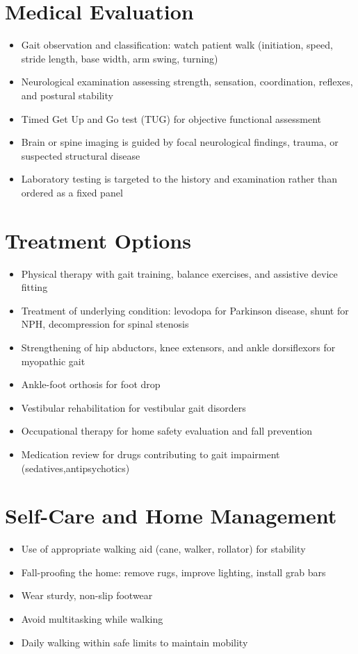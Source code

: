 \section*{Medical Evaluation}
\begin{itemize}
  \item Gait observation and classification: watch patient walk (initiation, speed, stride length, base width, arm swing, turning)
  \item Neurological examination assessing strength, sensation, coordination, reflexes, and postural stability
  \item Timed Get Up and Go test (TUG) for objective functional assessment
  \item Brain or spine imaging is guided by focal neurological findings, trauma, or suspected structural disease
  \item Laboratory testing is targeted to the history and examination rather than ordered as a fixed panel
\end{itemize}

\section*{Treatment Options}
\begin{itemize}
  \item Physical therapy with gait training, balance exercises, and assistive device fitting
  \item Treatment of underlying condition: levodopa for Parkinson disease, shunt for NPH, decompression for spinal stenosis
  \item Strengthening of hip abductors, knee extensors, and ankle dorsiflexors for myopathic gait
  \item Ankle-foot orthosis for foot drop
  \item Vestibular rehabilitation for vestibular gait disorders
  \item Occupational therapy for home safety evaluation and fall prevention
  \item Medication review for drugs contributing to gait impairment (sedatives,antipsychotics)
\end{itemize}

\section*{Self-Care and Home Management}
\begin{itemize}
  \item Use of appropriate walking aid (cane, walker, rollator) for stability
  \item Fall-proofing the home: remove rugs, improve lighting, install grab bars
  \item Wear sturdy, non-slip footwear
  \item Avoid multitasking while walking
  \item Daily walking within safe limits to maintain mobility
\end{itemize}


